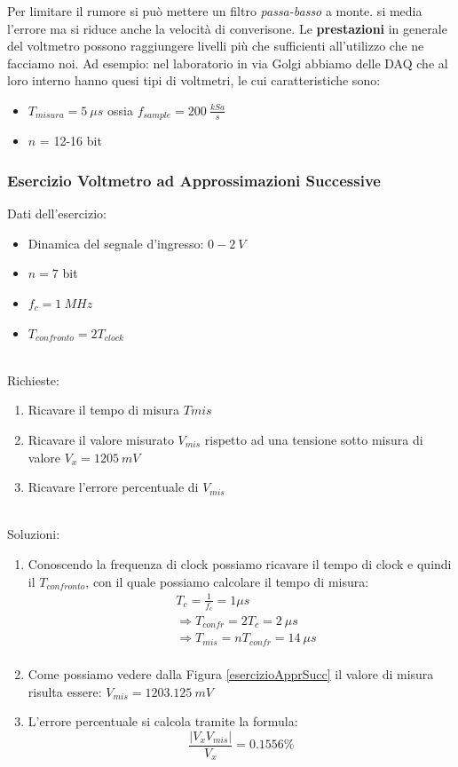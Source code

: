\documentclass[a4paper,11pt]{report}
\begin{document}
Per limitare il rumore si può mettere un filtro \textit{passa-basso} a monte. si media l'errore ma si riduce anche la velocità di converisone. Le \textbf{prestazioni} in generale del voltmetro possono raggiungere livelli più che sufficienti all'utilizzo che ne facciamo noi. Ad esempio: nel laboratorio in via Golgi abbiamo delle DAQ che al loro interno hanno quesi tipi di voltmetri, le cui caratteristiche sono:
\begin{itemize}
  \item $ T_{misura} = 5~\mu s $ ossia $ f_{sample} = 200~\frac{kSa}{s} $
  \item $ n $ = 12-16 bit
\end{itemize}
\newpage
\subsubsection{Esercizio Voltmetro ad Approssimazioni Successive}
Dati dell'esercizio:
\begin{itemize}
  \item Dinamica del segnale d'ingresso: $ 0-2~V $
  \item $ n = 7 $ bit
  \item $ f_{c} = 1~MHz $
  \item $ T_{confronto} = 2T_{clock} $
\end{itemize}~\\
Richieste:
\begin{enumerate}
  \item Ricavare il tempo di misura $ T{mis} $
  \item Ricavare il valore misurato $ V_{mis} $ rispetto ad una tensione sotto misura di valore $ V_x = 1205~mV $
  \item Ricavare l'errore percentuale di $ V_{mis} $ 
\end{enumerate}~\\
Soluzioni:
\begin{enumerate}
  \item Conoscendo la frequenza di clock possiamo ricavare il tempo di clock e quindi il $ T_{confronto} $, con il quale possiamo calcolare il tempo di misura:
  \begin{align*}
    &T_c = \frac{1}{f_c} = 1 \mu s \\
    &\Rightarrow T_{confr} = 2T_c = 2~\mu s \\
    &\Rightarrow T_{mis} = nT_{confr} = 14~\mu s \\
  \end{align*}
  \item Come possiamo vedere dalla Figura \ref{esercizioApprSucc} il valore di misura risulta essere: $ V_{mis} = 1203.125~mV $
  \item L'errore percentuale si calcola tramite la formula:
  $$
    \frac{|V_x  V_{mis}|}{V_x} = 0.1556 \%
  $$
\end{enumerate}
\end{document}
